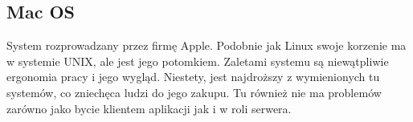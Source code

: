     \subsection{Mac OS}
    System rozprowadzany przez firmę Apple.
    Podobnie jak Linux swoje korzenie ma w systemie UNIX, ale jest jego potomkiem.
    Zaletami systemu są niewątpliwie ergonomia pracy i jego wygląd.
    Niestety, jest najdroższy z wymienionych tu systemów, co zniechęca ludzi do jego zakupu.
    Tu również nie ma problemów zarówno jako bycie klientem aplikacji jak i w roli serwera.

